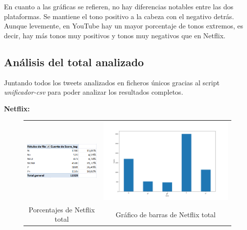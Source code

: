 En cuanto a las gráficas se refieren, no hay diferencias notables entre las dos plataformas. Se mantiene el tono positivo a la cabeza con el negativo detrás. Aunque levemente, en YouTube hay un mayor porcentaje de tonos extremos, es decir, hay más tonos muy positivos y tonos muy negativos que en Netflix. 



\subsection{Análisis del total analizado}
Juntando todos los tweets analizados en ficheros únicos gracias al script \textit{unificador-csv} para poder analizar los resultados completos.


\textbf{Netflix: }

 \begin{figure}[H]
	\centering
	\begin{tabular}{c c}
		
		\includegraphics[scale=.7]{imagenes/porcentajeNetflixAll-NONE.png}
		&  \includegraphics[scale=.7]{imagenes/barrasNetflixAll.png} \\ 
		
		{Porcentajes de Netflix total}
		
		&  {Gráfico de barras de Netflix total} \\ 
		
	\end{tabular} 
	\label{fig:NetflixAll}
\end{figure}


